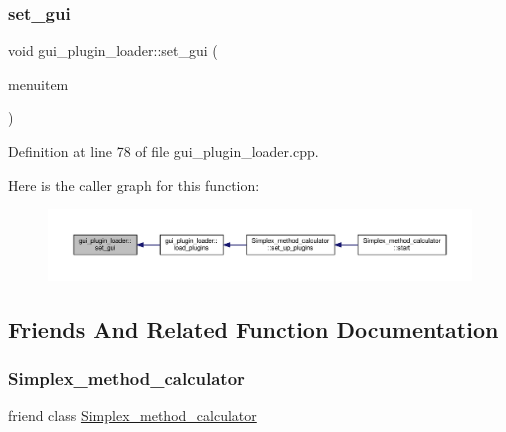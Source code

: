 \subsubsection{\texorpdfstring{set\+\_\+gui}{set\_gui}}
{\footnotesize\ttfamily void gui\+\_\+plugin\+\_\+loader\+::set\+\_\+gui (\begin{DoxyParamCaption}\item[{Q\+Action $\ast$}]{menuitem }\end{DoxyParamCaption})\hspace{0.3cm}{\ttfamily [slot]}}



Definition at line 78 of file gui\+\_\+plugin\+\_\+loader.\+cpp.

Here is the caller graph for this function\+:\nopagebreak
\begin{figure}[H]
\begin{center}
\leavevmode
\includegraphics[width=350pt]{classgui__plugin__loader_a0d2c0ab3d2eefbc2b6dcc246ea58d43b_icgraph}
\end{center}
\end{figure}


\subsection{Friends And Related Function Documentation}
\mbox{\label{classgui__plugin__loader_aa57bcac61e09f9c999a2f048dc923409}} 
\subsubsection{\texorpdfstring{Simplex\+\_\+method\+\_\+calculator}{Simplex\_method\_calculator}}
{\footnotesize\ttfamily friend class \hyperlink{classSimplex__method__calculator}{Simplex\+\_\+method\+\_\+calculator}\hspace{0.3cm}{\ttfamily [friend]}}



